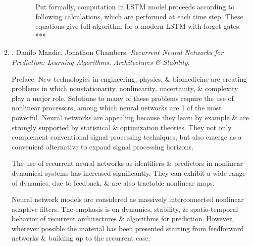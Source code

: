 \documentclass{article}
\begin{document}
\begin{enumerate}
\begin{itemize}
\begin{itemize}
			Put formally, computation in LSTM model proceeds according to following calculations, which are performed at each time step. These equations give full algorithm for a modern LSTM with forget gates: ***
		\end{itemize}
	\end{itemize}
	
	\item \cite{Mandic_Chambers2001}. {\sc Danilo Mandic, Jonathon Chambers}. {\it Recurrent Neural Networks for Prediction: Learning Algorithms, Architectures \& Stability}.
	
	{\sf Preface.} New technologies in engineering, physics, \& biomedicine are creating problems in which nonstationarity, nonlinearity, uncertainty, \& complexity play a major role. Solutions to many of these problems require the use of nonlinear processors, among which neural networks are 1 of the most powerful. Neural networks are appealing because they learn by example \& are strongly supported by statistical \& optimization theories. They not only complement conventional signal processing techniques, but also emerge as a convenient alternative to expand signal processing horizons.
	
	The use of recurrent neural networks as identifiers \& predictors in nonlinear dynamical systems has increased significantly. They can exhibit a wide range of dynamics, due to feedback, \& are also tractable nonlinear maps.
	
	Neural network models are considered as massively interconnected nonlinear adaptive filters. The emphasis is on dynamics, stability, \& spatio-temporal behavior of recurrent architectures \& algorithms for prediction. However, wherever possible the material has been presented starting from feedforward networks \& building up to the recurrent case.
	

\end{enumerate}
\end{document}
